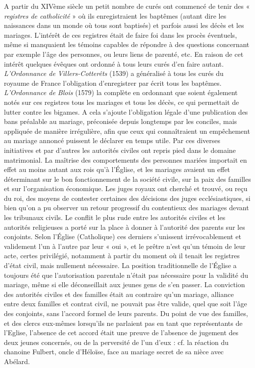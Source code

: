  A partir du XIVème siècle un petit nombre de curés ont commencé de tenir des « \emph{registres de catholicité} » où ils enregistraient les baptêmes (autant dire les naissances dans un monde où tous sont baptisés) et parfois aussi les décès et les mariages. L'intérêt de ces registres était de faire foi dans les procès éventuels, même si manquaient les témoins capables de répondre à des questions concernant par exemple l'âge des personnes, ou leurs liens de parenté, etc. En raison de cet intérêt quelques évêques ont ordonné à tous leurs curés d'en faire autant.\emph{ L'Ordonnance de Villers-Cotterêts} (1539) a généralisé à tous les curés du royaume de France l'obligation d'enregistrer par écrit tous les baptêmes. \emph{L'Ordonnance de Blois} (1579) la complète en ordonnant que soient également notés sur ces registres tous les mariages et tous les décès, ce qui permettait de lutter contre les bigames. A cela s'ajoute l'obligation légale d'une publication des bans préalable au mariage, préconisée depuis longtemps par les conciles, mais appliquée de manière irrégulière, afin que ceux qui connaîtraient un empêchement au mariage annoncé puissent le déclarer en temps utile. Par ces diverses initiatives et par d'autres les autorités civiles ont repris pied dans le domaine matrimonial. La maîtrise des comportements des personnes mariées importait en effet au moins autant aux rois qu'à l'Église, et les mariages avaient un effet déterminant sur le bon fonctionnement de la société civile, sur la paix des familles et sur l'organisation économique. Les juges royaux ont cherché et trouvé, ou reçu du roi, des moyens de contester certaines des décisions des juges ecclésiastiques, si bien qu'on a pu observer un retour progressif du contentieux des mariages devant les tribunaux civils. 
 Le conflit le plus rude entre les autorités civiles et les autorités religieuses a porté sur la place à donner à l'autorité des parents sur les conjoints. Selon l'Église (Catholique) ces derniers s'unissent irrévocablement et validement l'un à l'autre par leur « oui », et le prêtre n'est qu'un témoin de leur acte, certes privilégié, notamment à partir du moment où il tenait les registres d'état civil, mais nullement nécessaire. La position traditionnelle de l'Église a toujours été que l'autorisation parentale n'était pas nécessaire pour la validité du mariage, même si elle déconseillait aux jeunes gens de s'en passer. La conviction des autorités civiles et des familles était au contraire qu'un mariage, alliance entre deux familles et contrat civil, ne pouvait pas être valide, quel que soit l'âge des conjoints, sans l'accord formel de leurs parents. Du point de vue des familles, et des clercs eux-mêmes lorsqu'ils ne parlaient pas en tant que représentants de l'Eglise, l'absence de cet accord était une preuve de l'absence de jugement des deux jeunes concernés, ou de la perversité de l'un d'eux : cf. la réaction du chanoine Fulbert, oncle d'Héloïse, face au mariage secret de sa nièce avec Abélard. 
